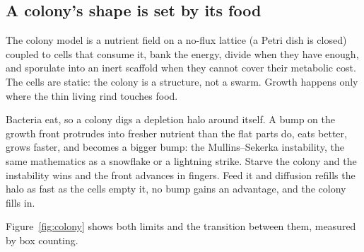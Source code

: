 \documentclass[11pt,a4paper]{article}
\begin{document}
\subsection{A colony's shape is set by its food}

The colony model is a nutrient field on a no-flux lattice (a Petri dish is
closed) coupled to cells that consume it, bank the energy, divide when they have
enough, and sporulate into an inert scaffold when they cannot cover their
metabolic cost. The cells are static: the colony is a structure, not a swarm.
Growth happens only where the thin living rind touches food.

Bacteria eat, so a colony digs a depletion halo around itself. A bump on the
growth front protrudes into fresher nutrient than the flat parts do, eats better,
grows faster, and becomes a bigger bump: the Mullins--Sekerka instability, the
same mathematics as a snowflake or a lightning strike. Starve the colony and the
instability wins and the front advances in fingers. Feed it and diffusion refills
the halo as fast as the cells empty it, no bump gains an advantage, and the
colony fills in.

Figure~\ref{fig:colony} shows both limits and the transition between them,
measured by box counting.
\end{document}
